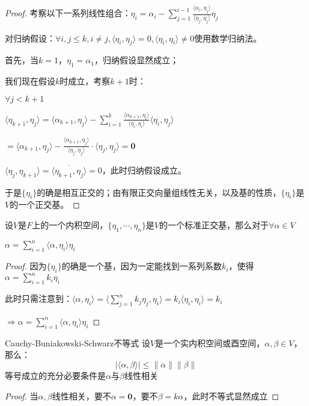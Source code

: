\documentclass[12pt, a4paper, oneside, UTF8]{ctexbook}
\begin{document}
\begin{para}{0}
\begin{proof}
						考察以下一系列线性组合：$\eta_i = \alpha_i - \sum\limits_{j=1}^{i-1} \frac{\langle \alpha _i ,\eta_j \rangle}{\langle \eta_j ,\eta_j \rangle} \eta_j$

						对归纳假设：$\forall i,j\leqslant k,i \neq j,\langle \eta_i,\eta_j \rangle = 0,\langle \eta_i,\eta_i \rangle \neq 0$使用数学归纳法。

						首先，当$k=1$，$\eta_1=\alpha_1$，归纳假设显然成立；

						我们现在假设$k$时成立，考察$k+1$时：

						$\forall j < k+1$

						$\langle \eta_{k+1},\eta_j \rangle = \langle \alpha_{k+1},\eta_j \rangle - \sum\limits_{i=1}^{k} \frac{\langle \alpha_{k+1},\eta_i \rangle}{\langle \eta_i,\eta_i \rangle} \langle \eta_i,\eta_j \rangle$

						$=\langle \alpha_{k+1},\eta_j \rangle - \frac{\langle \alpha_{k+1},\eta_j \rangle}{\langle \eta_j,\eta_j \rangle} \cdot \langle \eta_j,\eta_j \rangle = \mathbf{0}$

						$\langle \eta_j,\eta_{k+1} \rangle = \overline{\langle \eta_{k+1},\eta_j \rangle} = 0$，此时归纳假设成立。

						于是$\{\eta_i\}$的确是相互正交的；由有限正交向量组线性无关，以及基的性质，$\{\eta_i\}$是$V$的一个正交基。
					\end{proof}
				\point{}
					\begin{proposition}
						设$V$是$F$上的一个内积空间，$\{\eta_1,\cdots,\eta_n\}$是$V$的一个标准正交基，那么对于$\forall \alpha \in V$

						$\alpha = \sum\limits_{i=1}^{n} \langle \alpha , \eta_i \rangle \eta_i$
					\end{proposition}
					\begin{proof}
						因为$\{\eta_i\}$的确是一个基，因为一定能找到一系列系数$k_i$，使得$\alpha = \sum\limits_{i=1}^n k_i \eta_i $

						此时只需注意到：$\langle \alpha ,\eta_i \rangle = \langle \sum\limits_{j=1}^n k_j \eta_j ,\eta_i \rangle = k_i \langle \eta_i ,\eta_i \rangle = k_i$

						$\Rightarrow \alpha =\sum\limits_{i=1}^{n} \langle \alpha , \eta_i \rangle \eta_i$
					\end{proof}
				\point{}
					\begin{them}{Cauchy-Buniakowski-Schwarz不等式}{}
						设$V$是一个实内积空间或酉空间，$\alpha ,\beta \in V$，那么：
						\begin{equation}
							|\langle \alpha ,\beta \rangle | \leqslant \|\alpha \| \|\beta \|
						\end{equation}
						等号成立的充分必要条件是$\alpha $与$\beta $线性相关
					\end{them}
					\begin{proof}
						当$\alpha ,\beta $线性相关，要不$\alpha =\mathbf{0}$，要不$\beta =k\alpha $，此时不等式显然成立


\end{proof}
\end{para}
\end{document}
